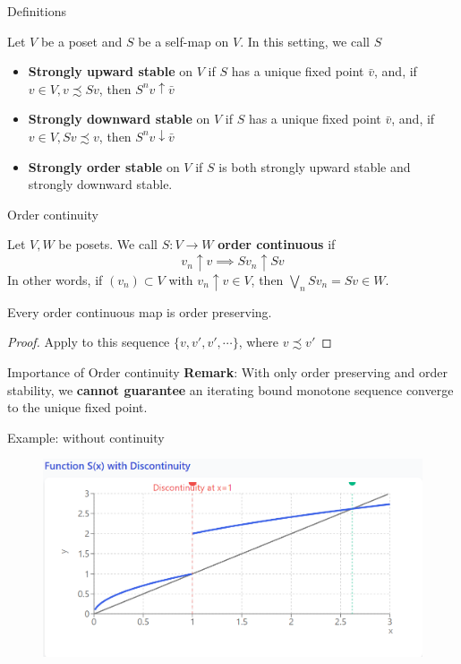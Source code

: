 \begin{frame}{Definitions}
\begin{definition}
Let $V$ be a poset and $S$ be a self-map on $V$. In this setting, we call $S$
\begin{itemize}
    \item \textbf{Strongly upward stable} on $V$ if $S$ has a unique fixed point $\bar v$, and, if $v\in V, v\precsim Sv$, then $S^nv\uparrow \bar v$
    \item \textbf{Strongly downward stable} on $V$ if $S$ has a unique fixed point $\bar v$, and, if $v\in V, Sv\precsim v$, then $S^nv\downarrow \bar v$
    \item \textbf{Strongly order stable} on $V$ if $S$ is both strongly upward stable and strongly downward stable.
\end{itemize}
\end{definition}
\end{frame}
\begin{frame}{Order continuity}

    \begin{definition}
    Let $V, W$ be posets. We call $S: V\to W$ \textbf{order continuous} if 
    $$
    v_n\uparrow v \implies Sv_n\uparrow Sv
    $$
    In other words, if $(v_n)\subset V$ with $v_n\uparrow v\in V$, then $\bigvee_n S v_n = Sv\in W$.
     \end{definition}
     \begin{lemma}
         Every order continuous map is order preserving.
     \end{lemma}
     \begin{proof}
         Apply to this sequence $\{v,v',v',\cdots\}$, where $v\precsim v'$
     \end{proof}
\end{frame}
\begin{frame}{Importance of Order continuity}
\textbf{Remark}: With only order preserving and order stability, we \textbf{cannot guarantee} an iterating bound monotone sequence converge to the unique fixed point.
    
\end{frame}
\begin{frame}{Example: without continuity}
\begin{figure}
    \centering
    \includegraphics[width=1\linewidth]{Dynamic Programming/DP2/Chapter 1/Section 1.2/figure/discontinuous.png}
\end{figure}
    
\end{frame}

